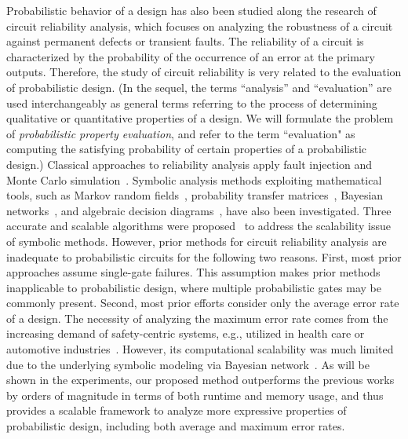 Probabilistic behavior of a design has also been studied along the research of circuit reliability analysis, which focuses on analyzing the robustness of a circuit against permanent defects or transient faults.
The reliability of a circuit is characterized by the probability of the occurrence of an error at the primary outputs.
Therefore, the study of circuit reliability is very related to the evaluation of probabilistic design.
(In the sequel, the terms ``analysis'' and ``evaluation'' are used interchangeably as general terms referring to the process of determining qualitative or quantitative properties of a design.
We will formulate the problem of \textit{probabilistic property evaluation}, and refer to the term ``evaluation" as computing the satisfying probability of certain properties of a probabilistic design.)
Classical approaches to reliability analysis apply fault injection and Monte Carlo simulation~\cite{Mohanram2003}.
Symbolic analysis methods exploiting mathematical tools, such as Markov random fields~\cite{Bahar2003}, probability transfer matrices~\cite{Krishnaswamy2005}, Bayesian networks~\cite{Rejimon2005}, and algebraic decision diagrams~\cite{Miskov-Zivanov2006}, have also been investigated.
Three accurate and scalable algorithms were proposed~\cite{Choudhury2009} to address the scalability issue of symbolic methods.
However, prior methods for circuit reliability analysis are inadequate to probabilistic circuits for the following two reasons.
First, most prior approaches assume single-gate failures.
This assumption makes prior methods inapplicable to probabilistic design, where multiple probabilistic gates may be commonly present.
Second, most prior efforts consider only the average error rate of a design.
The necessity of analyzing the maximum error rate comes from the increasing demand of safety-centric systems, e.g., utilized in health care or automotive industries~\cite{Lingasubramanian2007,Lingasubramanian2011}.
However, its computational scalability was much limited due to the underlying symbolic modeling via Bayesian network~\cite{Jensen1996}.
As will be shown in the experiments, our proposed method outperforms the previous works~\cite{Lingasubramanian2007,Lingasubramanian2011} by orders of magnitude in terms of both runtime and memory usage, and thus provides a scalable framework to analyze more expressive properties of probabilistic design, including both average and maximum error rates.


